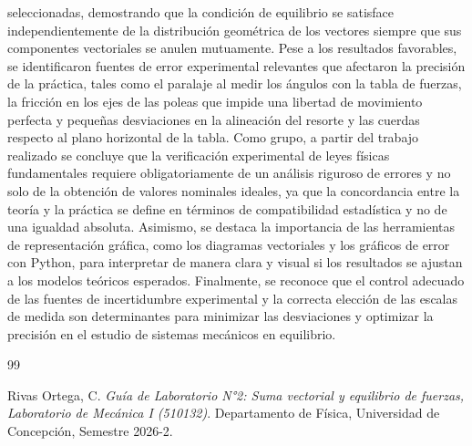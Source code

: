 \documentclass[12pt,a4paper]{article}
\begin{document}
seleccionadas, demostrando que la condición de equilibrio se satisface independientemente de la distribución geométrica de los vectores siempre que sus componentes vectoriales se anulen mutuamente. Pese a los resultados favorables, se identificaron fuentes de error experimental relevantes que afectaron la precisión de la práctica, tales como el paralaje al medir los ángulos con la tabla de fuerzas, la fricción en los ejes de las poleas que impide una libertad de movimiento perfecta y pequeñas desviaciones en la alineación del resorte y las cuerdas respecto al plano horizontal de la tabla.   Como grupo, a partir del trabajo realizado se concluye que la verificación experimental de leyes físicas fundamentales requiere obligatoriamente de un análisis riguroso de errores y no solo de la obtención de valores nominales ideales, ya que la concordancia entre la teoría y la práctica se define en términos de compatibilidad estadística y no de una igualdad absoluta. Asimismo, se destaca la importancia de las herramientas de representación gráfica, como los diagramas vectoriales y los gráficos de error con Python, para interpretar de manera clara y visual si los resultados se ajustan a los modelos teóricos esperados. Finalmente, se reconoce que el control adecuado de las fuentes de incertidumbre experimental y la correcta elección de las escalas de medida son determinantes para minimizar las desviaciones y optimizar la precisión en el estudio de sistemas mecánicos en equilibrio. 

\begin{thebibliography}{99}

 Rivas Ortega, C. \textit{Guía de Laboratorio N°2: Suma vectorial y equilibrio de fuerzas, Laboratorio de Mecánica I (510132)}. Departamento de Física, Universidad de Concepción, Semestre 2026-2.


\end{thebibliography}
\end{document}
